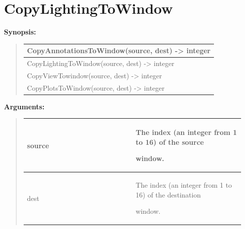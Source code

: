 \documentclass[letterpaper,10pt,english]{sphinxmanual}
\begin{document}
\section{CopyLightingToWindow}
\label{functions:copylightingtowindow}
\begin{DUlineblock}{0em}
\item[] \textbf{Synopsis:}
\end{DUlineblock}
\begin{quote}

\begin{tabulary}{\linewidth}{|L|}
\hline

CopyAnnotationsToWindow(source, dest) -\textgreater{} integer
\\
\hline
CopyLightingToWindow(source, dest) -\textgreater{} integer
\\
\hline
CopyViewTowindow(source, dest) -\textgreater{} integer
\\
\hline
CopyPlotsToWindow(source, dest) -\textgreater{} integer
\\
\hline\end{tabulary}

\end{quote}

\begin{DUlineblock}{0em}
\item[] 
\item[] \textbf{Arguments:}
\end{DUlineblock}
\begin{quote}

\begin{tabular}{|p{0.475\linewidth}|p{0.475\linewidth}|}
\hline

source
 & 
\begin{DUlineblock}{0em}
\item[] The index (an integer from 1 to 16) of the source
\item[] window.
\end{DUlineblock}
\\
\hline
dest
 & 
\begin{DUlineblock}{0em}
\item[] The index (an integer from 1 to 16) of the destination
\item[] window.
\end{DUlineblock}
\\
\hline\end{tabular}

\end{quote}
\end{document}

